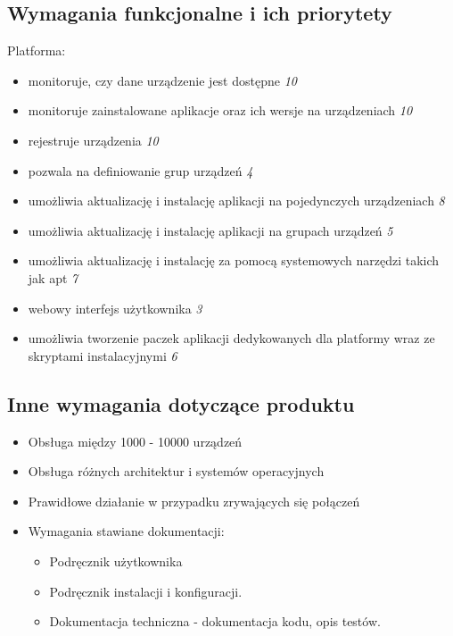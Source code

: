 \documentclass[polish,12pt]{aghthesis}
\begin{document}
\subsection{Wymagania funkcjonalne i ich priorytety}
Platforma:
\begin{itemize}
\item monitoruje, czy dane urządzenie jest dostępne \emph{10}
\item monitoruje zainstalowane aplikacje oraz ich wersje na urządzeniach \emph{10}
\item rejestruje urządzenia \emph{10}
\item pozwala na definiowanie grup urządzeń \emph{4}
\item umożliwia aktualizację i instalację aplikacji na pojedynczych urządzeniach \emph{8}
\item umożliwia aktualizację i instalację aplikacji na grupach urządzeń \emph{5}
\item umożliwia aktualizację i instalację za pomocą systemowych narzędzi takich jak apt \emph{7}
\item webowy interfejs użytkownika \emph{3}
\item umożliwia tworzenie paczek aplikacji dedykowanych dla platformy wraz ze skryptami instalacyjnymi \emph{6}
\end{itemize}

\subsection{Inne wymagania dotyczące produktu}
\begin{itemize}
\item Obsługa między 1000 - 10000 urządzeń
\item Obsługa różnych architektur i systemów operacyjnych
\item Prawidłowe działanie w przypadku zrywających się połączeń
\item Wymagania stawiane dokumentacji:
  \begin{itemize}
  \item Podręcznik użytkownika
  \item Podręcznik instalacji i konfiguracji.
  \item Dokumentacja techniczna - dokumentacja kodu, opis testów.
  \end{itemize}
\end{itemize}
\end{document}
